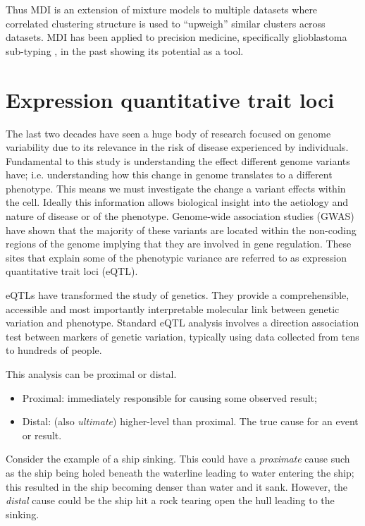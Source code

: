 \documentclass[11pt]{article} %
\begin{document}
	Thus MDI is an extension of mixture models to multiple datasets where correlated clustering structure is used to ``upweigh'' similar clusters across datasets. MDI has been applied to precision medicine, specifically glioblastoma sub-typing \cite{savage_identifying_2013}, in the past showing its potential as a tool.
	
	\section{Expression quantitative trait loci}
	The last two decades have seen a huge body of research focused on genome variability due to its 
	relevance in the risk of disease experienced by individuals. Fundamental to this study is 
	understanding the effect different genome variants have; i.e. understanding how this change 
	in genome translates to a different phenotype. This means we must investigate the change a 
	variant effects within the cell. Ideally this information allows biological insight into the 
	aetiology and nature of disease or of the phenotype. Genome-wide association studies (GWAS) 
	\cite{feero_genomewide_2010} have shown that the majority of these variants are located within 
	the non-coding regions of the genome \cite{nica_expression_2013} implying that they are involved in gene regulation. These 
	sites that explain some of the phenotypic variance are referred to as expression quantitative 
	trait loci (eQTL).
	
	eQTLs have transformed the study of genetics. They provide a comprehensible, accessible and 
	most importantly interpretable molecular link between genetic variation and phenotype. Standard 
	eQTL analysis involves a direction association test between markers of genetic variation, 
	typically using data collected from tens to hundreds of people.
	
	This analysis can be proximal or distal.
	\begin{itemize}
		\item Proximal: immediately responsible for causing some observed result;
		\item Distal: (also \emph{ultimate}) higher-level than proximal. The true cause for an event or 
		result.
	\end{itemize}
	Consider the example of a ship sinking. This could have a \emph{proximate} cause such as the ship 
	being holed beneath the waterline leading to water entering the ship; this resulted in the ship 
	becoming denser than water and it sank. However, the \emph{distal} cause could be the ship hit a 
	rock tearing open the hull leading to the sinking.
	
\end{document}
